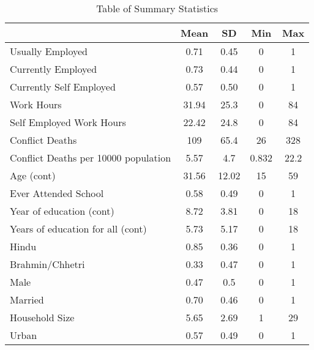 \begin{table}
	
	\caption{Table of Summary Statistics}
	
	\renewcommand{\arraystretch}{1.5}
	
	\begin{tabular}{lcccc}
		& Mean & SD & Min & Max\tabularnewline
		\hline 
		Usually Employed  & 0.71 & 0.45 & 0 & 1\tabularnewline
		Currently Employed  & 0.73 & 0.44 & 0 & 1\tabularnewline
		Currently Self Employed  & 0.57 & 0.50 & 0 & 1\tabularnewline
		Work Hours  & 31.94 & 25.3 & 0 & 84\tabularnewline
		Self Employed Work Hours & 22.42 & 24.8 & 0 & 84\tabularnewline
		Conflict Deaths  & 109 & 65.4 & 26 & 328\tabularnewline
		Conflict Deaths per 10000 population  & 5.57 & 4.7 & 0.832 & 22.2\tabularnewline
		Age (cont) & 31.56 & 12.02 & 15 & 59\tabularnewline
		Ever Attended School  & 0.58 & 0.49 & 0 & 1\tabularnewline
		Year of education (cont) & 8.72 & 3.81 & 0 & 18\tabularnewline
		Years of education for all (cont) & 5.73 & 5.17 & 0 & 18\tabularnewline
		Hindu  & 0.85 & 0.36 & 0 & 1\tabularnewline
		Brahmin/Chhetri & 0.33 & 0.47 & 0 & 1\tabularnewline
		Male  & 0.47 & 0.5 & 0 & 1\tabularnewline
		Married  & 0.70 & 0.46 & 0 & 1\tabularnewline
		Household Size & 5.65 & 2.69 & 1 & 29\tabularnewline
		Urban & 0.57 & 0.49 & 0 & 1\tabularnewline
		\hline 
	\end{tabular}
	
\end{table}
